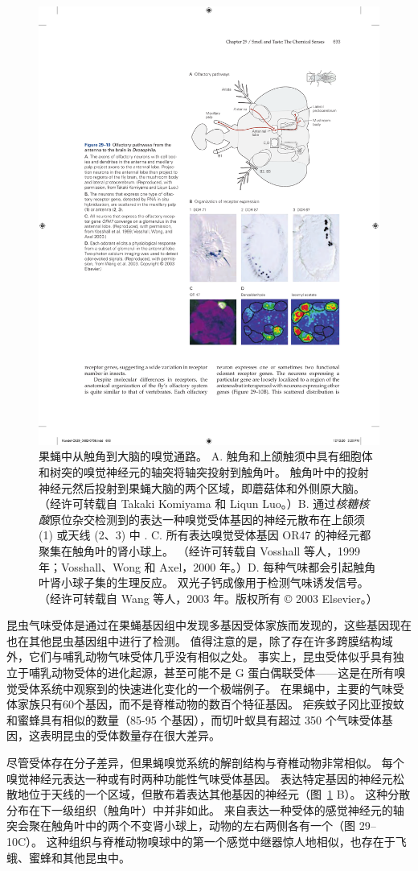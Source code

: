 \begin{figure}[htbp]
	\centering
	\includegraphics[width=0.6\linewidth]{chap29/fig_29_10}
	\caption{果蝇中从触角到大脑的嗅觉通路。 A. 触角和上颌触须中具有细胞体和树突的嗅觉神经元的轴突将轴突投射到触角叶。 触角叶中的投射神经元然后投射到果蝇大脑的两个区域，即蘑菇体和外侧原大脑。 （经许可转载自 Takaki Komiyama 和 Liqun Luo。）B. 通过\textit{核糖核酸}原位杂交检测到的表达一种嗅觉受体基因的神经元散布在上颌须 (1) 或天线 (2、3) 中 . C. 所有表达嗅觉受体基因 OR47 的神经元都聚集在触角叶的肾小球上。 （经许可转载自 Vosshall 等人，1999 年；Vosshall、Wong 和 Axel，2000 年。）D. 每种气味都会引起触角叶肾小球子集的生理反应。 双光子钙成像用于检测气味诱发信号。 （经许可转载自 Wang 等人，2003 年。版权所有 © 2003 Elsevier。）}
	\label{fig:29_10}
\end{figure}


昆虫气味受体是通过在果蝇基因组中发现多基因受体家族而发现的，这些基因现在也在其他昆虫基因组中进行了检测。
值得注意的是，除了存在许多跨膜结构域外，它们与哺乳动物气味受体几乎没有相似之处。
事实上，昆虫受体似乎具有独立于哺乳动物受体的进化起源，甚至可能不是 G 蛋白偶联受体——这是在所有嗅觉受体系统中观察到的快速进化变化的一个极端例子。
在果蝇中，主要的气味受体家族只有60个基因，而不是脊椎动物的数百个特征基因。
疟疾蚊子冈比亚按蚊和蜜蜂具有相似的数量（85-95 个基因），而切叶蚁具有超过 350 个气味受体基因，这表明昆虫的受体数量存在很大差异。


尽管受体存在分子差异，但果蝇嗅觉系统的解剖结构与脊椎动物非常相似。
每个嗅觉神经元表达一种或有时两种功能性气味受体基因。
表达特定基因的神经元松散地位于天线的一个区域，但散布着表达其他基因的神经元（图~\ref{fig:29_10} B）。
这种分散分布在下一级组织（触角叶）中并非如此。
来自表达一种受体的感觉神经元的轴突会聚在触角叶中的两个不变肾小球上，动物的左右两侧各有一个（图 29–10C）。
这种组织与脊椎动物嗅球中的第一个感觉中继器惊人地相似，也存在于飞蛾、蜜蜂和其他昆虫中。



